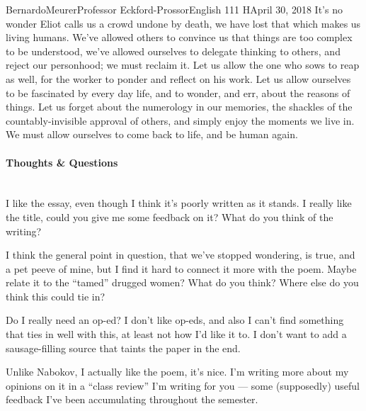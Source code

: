 \documentclass[12pt,letterpaper]{article}
\begin{document}
\begin{mla}{Bernardo}{Meurer}{Professor Eckford-Prossor}{English 111 H}{April 30, 2018}
	It's no wonder Eliot calls us a crowd undone by death, we have lost that which makes us living humans. We've allowed others to convince us that things are too complex to be understood, we've allowed ourselves to delegate thinking to others, and reject our personhood; we must reclaim it. Let us allow the one who sows to reap as well, for the worker to ponder and reflect on his work. Let us allow ourselves to be fascinated by every day life, and to wonder, and err, about the reasons of things. Let us forget about the numerology in our memories, the shackles of the countably-invisible approval of others, and simply enjoy the moments we live in. We must allow ourselves to come back to life, and be human again.
	\newpage
	\paragraph*{Thoughts \& Questions}  \hspace{0pt} \\
	I like the essay, even though I think it's poorly written as it stands. I really like the title, could you give me some feedback on it? What do you think of the writing?

	I think the general point in question, that we've stopped wondering, is true, and a pet peeve of mine, but I find it hard to connect it more with the poem. Maybe relate it to the ``tamed'' drugged women? What do you think? Where else do you think this could tie in?

	Do I really need an op-ed? I don't like op-eds, and also I can't find something that ties in well with this, at least not how I'd like it to. I don't want to add a sausage-filling source that taints the paper in the end.

	Unlike Nabokov, I actually like the poem, it's nice. I'm writing more about my opinions on it in a ``class review'' I'm writing for you --- some (supposedly) useful feedback I've been accumulating throughout the semester.
\end{mla}
\end{document}
